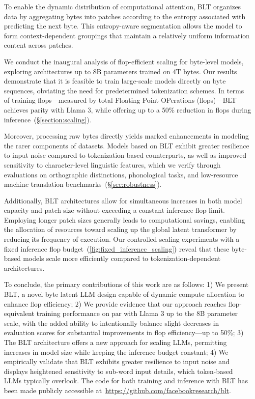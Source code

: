 To enable the dynamic distribution of computational attention, {\textsc BLT} organizes data by aggregating bytes into patches according to the entropy associated with predicting the next byte. This entropy-aware segmentation allows the model to form context-dependent groupings that maintain a relatively uniform information content across patches.

We conduct the inaugural analysis of flop-efficient scaling for byte-level models, exploring architectures up to 8B parameters trained on 4T bytes. Our results demonstrate that it is feasible to train large-scale models directly on byte sequences, obviating the need for predetermined tokenization schemes. In terms of training flops—measured by total Floating Point OPerations (flops)—{\textsc BLT} achieves parity with Llama 3, while offering up to a 50\% reduction in flops during inference~(\S\ref{section:scaling}).

Moreover, processing raw bytes directly yields marked enhancements in modeling the rarer components of datasets. Models based on {\textsc BLT} exhibit greater resilience to input noise compared to tokenization-based counterparts, as well as improved sensitivity to character-level linguistic features, which we verify through evaluations on orthographic distinctions, phonological tasks, and low-resource machine translation benchmarks~(\S\ref{sec:robustness}).

Additionally, {\textsc BLT} architectures allow for simultaneous increases in both model capacity and patch size without exceeding a constant inference flop limit. Employing longer patch sizes generally leads to computational savings, enabling the allocation of resources toward scaling up the global latent transformer by reducing its frequency of execution. Our controlled scaling experiments with a fixed inference flop budget~(\autoref{fig:fixed_inference_scaling}) reveal that these byte-based models scale more efficiently compared to tokenization-dependent architectures.

To conclude, the primary contributions of this work are as follows: 1) We present {\textsc BLT}, a novel byte latent LLM design capable of dynamic compute allocation to enhance flop efficiency; 2) We provide evidence that our approach reaches flop-equivalent training performance on par with Llama 3 up to the 8B parameter scale, with the added ability to intentionally balance slight decreases in evaluation scores for substantial improvements in flop efficiency—up to 50\%; 3) The {\textsc BLT} architecture offers a new approach for scaling LLMs, permitting increases in model size while keeping the inference budget constant; 4) We empirically validate that {\textsc BLT} exhibits greater resilience to input noise and displays heightened sensitivity to sub-word input details, which token-based LLMs typically overlook. The code for both training and inference with {\textsc BLT} has been made publicly accessible at~\url{https://github.com/facebookresearch/blt}.

